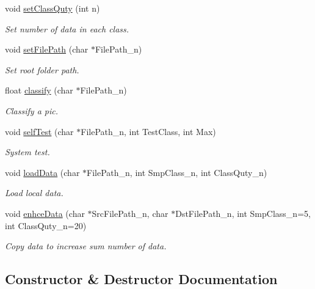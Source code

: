 \begin{DoxyCompactItemize}
void \hyperlink{class_k_n_n_class_a5b84fed800b8ec35d4598c2e93ecffd0}{set\+Class\+Quty} (int n)
\begin{DoxyCompactList}\small\item\em Set number of data in each class. \end{DoxyCompactList}\item 
void \hyperlink{class_k_n_n_class_a1563de21435f5b41038b3f85cf13af4f}{set\+File\+Path} (char $\ast$File\+Path\+\_\+n)
\begin{DoxyCompactList}\small\item\em Set root folder path. \end{DoxyCompactList}\item 
float \hyperlink{class_k_n_n_class_ad318211c13aaf923537d012e1b8ba55a}{classify} (char $\ast$File\+Path\+\_\+n)
\begin{DoxyCompactList}\small\item\em Classify a pic. \end{DoxyCompactList}\item 
void \hyperlink{class_k_n_n_class_a2fa2ca89eda4f96c4780294c96ec4a0e}{self\+Test} (char $\ast$File\+Path\+\_\+n, int Test\+Class, int Max)
\begin{DoxyCompactList}\small\item\em System test. \end{DoxyCompactList}\item 
void \hyperlink{class_k_n_n_class_a1d6c742008b2d31d82944eddbee4e1fe}{load\+Data} (char $\ast$File\+Path\+\_\+n, int Smp\+Class\+\_\+n, int Class\+Quty\+\_\+n)
\begin{DoxyCompactList}\small\item\em Load local data. \end{DoxyCompactList}\item 
void \hyperlink{class_k_n_n_class_ae4fb52403de36bd373ddc93e5ca7f183}{enhce\+Data} (char $\ast$Src\+File\+Path\+\_\+n, char $\ast$Dst\+File\+Path\+\_\+n, int Smp\+Class\+\_\+n=5, int Class\+Quty\+\_\+n=20)
\begin{DoxyCompactList}\small\item\em Copy data to increase sum number of data. \end{DoxyCompactList}\end{DoxyCompactItemize}


\subsection{Constructor \& Destructor Documentation}
